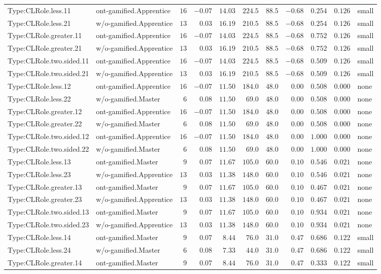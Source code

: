 \documentclass[6pt,a4paper]{article}
\begin{document}
{\begin{longtable}{llrrrrrrrrl}
Type:CLRole.less.11&ont-gamified.Apprentice&$16$&$-0.07$&$14.03$&$224.5$&$ 88.5$&$-0.68$&$0.254$&$0.126$&small\tabularnewline
Type:CLRole.less.21&w/o-gamified.Apprentice&$13$&$ 0.03$&$16.19$&$210.5$&$ 88.5$&$-0.68$&$0.254$&$0.126$&small\tabularnewline
Type:CLRole.greater.11&ont-gamified.Apprentice&$16$&$-0.07$&$14.03$&$224.5$&$ 88.5$&$-0.68$&$0.752$&$0.126$&small\tabularnewline
Type:CLRole.greater.21&w/o-gamified.Apprentice&$13$&$ 0.03$&$16.19$&$210.5$&$ 88.5$&$-0.68$&$0.752$&$0.126$&small\tabularnewline
Type:CLRole.two.sided.11&ont-gamified.Apprentice&$16$&$-0.07$&$14.03$&$224.5$&$ 88.5$&$-0.68$&$0.509$&$0.126$&small\tabularnewline
Type:CLRole.two.sided.21&w/o-gamified.Apprentice&$13$&$ 0.03$&$16.19$&$210.5$&$ 88.5$&$-0.68$&$0.509$&$0.126$&small\tabularnewline
Type:CLRole.less.12&ont-gamified.Apprentice&$16$&$-0.07$&$11.50$&$184.0$&$ 48.0$&$ 0.00$&$0.508$&$0.000$&none\tabularnewline
Type:CLRole.less.22&w/o-gamified.Master&$ 6$&$ 0.08$&$11.50$&$ 69.0$&$ 48.0$&$ 0.00$&$0.508$&$0.000$&none\tabularnewline
Type:CLRole.greater.12&ont-gamified.Apprentice&$16$&$-0.07$&$11.50$&$184.0$&$ 48.0$&$ 0.00$&$0.508$&$0.000$&none\tabularnewline
Type:CLRole.greater.22&w/o-gamified.Master&$ 6$&$ 0.08$&$11.50$&$ 69.0$&$ 48.0$&$ 0.00$&$0.508$&$0.000$&none\tabularnewline
Type:CLRole.two.sided.12&ont-gamified.Apprentice&$16$&$-0.07$&$11.50$&$184.0$&$ 48.0$&$ 0.00$&$1.000$&$0.000$&none\tabularnewline
Type:CLRole.two.sided.22&w/o-gamified.Master&$ 6$&$ 0.08$&$11.50$&$ 69.0$&$ 48.0$&$ 0.00$&$1.000$&$0.000$&none\tabularnewline
Type:CLRole.less.13&ont-gamified.Master&$ 9$&$ 0.07$&$11.67$&$105.0$&$ 60.0$&$ 0.10$&$0.546$&$0.021$&none\tabularnewline
Type:CLRole.less.23&w/o-gamified.Apprentice&$13$&$ 0.03$&$11.38$&$148.0$&$ 60.0$&$ 0.10$&$0.546$&$0.021$&none\tabularnewline
Type:CLRole.greater.13&ont-gamified.Master&$ 9$&$ 0.07$&$11.67$&$105.0$&$ 60.0$&$ 0.10$&$0.467$&$0.021$&none\tabularnewline
Type:CLRole.greater.23&w/o-gamified.Apprentice&$13$&$ 0.03$&$11.38$&$148.0$&$ 60.0$&$ 0.10$&$0.467$&$0.021$&none\tabularnewline
Type:CLRole.two.sided.13&ont-gamified.Master&$ 9$&$ 0.07$&$11.67$&$105.0$&$ 60.0$&$ 0.10$&$0.934$&$0.021$&none\tabularnewline
Type:CLRole.two.sided.23&w/o-gamified.Apprentice&$13$&$ 0.03$&$11.38$&$148.0$&$ 60.0$&$ 0.10$&$0.934$&$0.021$&none\tabularnewline
Type:CLRole.less.14&ont-gamified.Master&$ 9$&$ 0.07$&$ 8.44$&$ 76.0$&$ 31.0$&$ 0.47$&$0.686$&$0.122$&small\tabularnewline
Type:CLRole.less.24&w/o-gamified.Master&$ 6$&$ 0.08$&$ 7.33$&$ 44.0$&$ 31.0$&$ 0.47$&$0.686$&$0.122$&small\tabularnewline
Type:CLRole.greater.14&ont-gamified.Master&$ 9$&$ 0.07$&$ 8.44$&$ 76.0$&$ 31.0$&$ 0.47$&$0.333$&$0.122$&small\tabularnewline

\end{longtable}}
\end{document}
